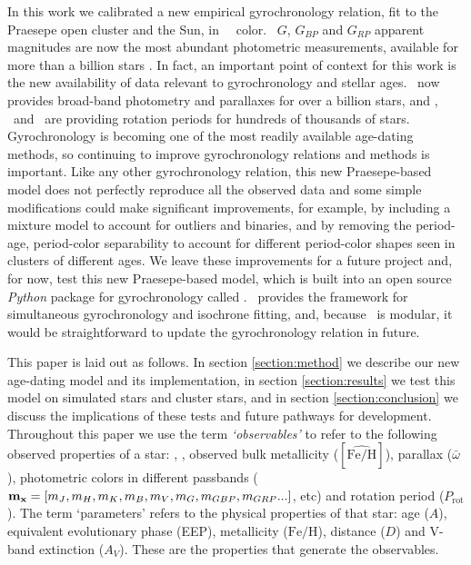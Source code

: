 In this work we calibrated a new empirical gyrochronology relation, fit to the
Praesepe open cluster and the Sun, in \gaia\ \gcolor\ color.
\Gaia\ $G$, $G_{BP}$ and $G_{RP}$ apparent magnitudes are now the most
abundant photometric measurements, available for more than a billion stars
\citep{brown2018}.
In fact, an important point of context for this work is the new
availability of data relevant to gyrochronology and stellar ages.
\Gaia\ now provides broad-band photometry and parallaxes for over a billion
stars, and \kepler, \ktwo\ and \tess\ are providing rotation periods for
hundreds of thousands of stars.
Gyrochronology is becoming one of the most readily available age-dating
methods, so continuing to improve gyrochronology relations and methods is
important.
Like any other gyrochronology relation, this new Praesepe-based model does not
perfectly reproduce all the observed data and some simple modifications could
make significant improvements, for example, by including a mixture model to
account for outliers and binaries, and by removing the period-age,
period-color separability to account for different period-color shapes seen in
clusters of different ages.
We leave these improvements for a future project and, for now, test this
new Praesepe-based model, which is built into an open source {\it Python}
package for gyrochronology called \sd.
\sd\ provides the framework for simultaneous gyrochronology and isochrone
fitting, and, because \sd\ is modular, it would be straightforward to update
the gyrochronology relation in future.

This paper is laid out as follows.
In section \ref{section:method} we describe our new age-dating model and its
implementation, in section \ref{section:results} we test this model on
simulated stars and cluster stars, and in section \ref{section:conclusion} we
discuss the implications of these tests and future pathways for development.
Throughout this paper we use the term {\it `observables'} to refer to the
following observed properties of a star: \teff, \logg, observed bulk
metallicity ($[\hat{\mathrm{Fe/H}}]$), parallax ($\bar{\omega}$), photometric
colors in different passbands (${\bf m_x} = [m_J, m_H, m_K, m_B, m_V, m_G,
m_{GBP}, m_{GRP}...]$, etc) and rotation period ($P_{\mathrm{rot}}$).
The term `parameters' refers to the physical properties of that star: age
($A$), equivalent evolutionary phase (EEP), metallicity ($\mathrm{Fe/H}$),
distance ($D$) and V-band extinction ($A_V$).
These are the properties that generate the observables.
